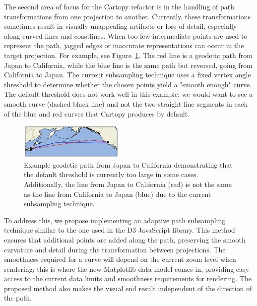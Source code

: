 \documentclass[12pt]{article}
\numberwithin{page}{section}
\begin{document}
The second area of focus for the Cartopy refactor is in the handling of path transformations from
one projection to another. Currently, these transformations sometimes result in
visually unappealing artifacts or loss of detail,
especially along curved lines and coastlines. When too few intermediate points
are used to represent the path, jagged edges or inaccurate
representations can occur in the target projection.
For example, see Figure~\ref{fig:cartopy_interpolation}.
The red line is a geodetic path from Japan to California, while the blue line
is the same path but reversed, going from California to Japan. The current subsampling technique
uses a fixed vertex angle threshold to determine whether the chosen points yield
a "smooth enough" curve. The default threshold does not work well in this
example; we would want to see a smooth curve (dashed black line) and not the
two straight line segments in each of the blue and red curves that Cartopy produces
by default.

\begin{figure}
  \includegraphics[width=0.45\textwidth]{supplemental/cartopy_interpolation}
  \caption{\small Example geodetic path from Japan to California demonstrating
  that the default threshold is currently too large in some cases. Additionally,
  the line from Japan to California (red) is not the same as the line from
  California to Japan (blue) due to the current subsampling technique.}
  \label{fig:cartopy_interpolation}
\end{figure}


To address this, we propose implementing an adaptive path subsampling technique similar to
the one used in the D3 JavaScript library. This method ensures that additional points are
added along the path, preserving the smooth curvature and detail during the
transformation between projections. The smoothness required for a curve will depend on the current
zoom level when rendering; this is where the new Matplotlib data model comes
in, providing easy
access to the current data limits and smoothness requirements for rendering.
The proposed method also makes the visual end result independent
of the direction of the path.
\end{document}
